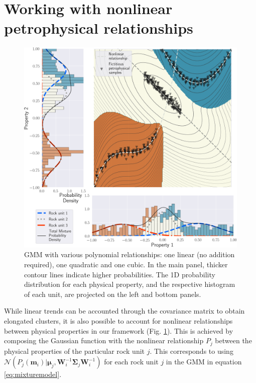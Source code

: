 \documentclass[extra, mreferee]{gji_joint} %
\begin{document}



\appendix

\section{Working with nonlinear petrophysical relationships} \label{LinearWithMappingSection}

\begin{figure}
    \includegraphics[width=\columnwidth]{Fig/LowRes/example_projection.png}
    \caption{GMM with various polynomial relationships: one linear (no addition required), one quadratic and one cubic. In the main panel, thicker contour lines indicate higher probabilities. The 1D probability distribution for each physical property, and the respective histogram of each unit, are projected on the left and bottom panels.}
    \label{fig:example_projection.png}
\end{figure}

While linear trends can be accounted through the covariance matrix to obtain elongated clusters, it is also possible to account for nonlinear relationships between physical properties in our framework (Fig. \ref{fig:example_projection.png}). This is achieved by composing the Gaussian function with the nonlinear relationship $P_j$ between the physical properties of the particular rock unit $j$. This corresponds to using $\mathcal{N}(P_j(\mathbf{m}_i)|\mathbf{\mu}_j, \mathbf{W}_i^{-1}\mathbf{\Sigma}_j\mathbf{W}_i^{-1})$ for each rock unit $j$ in the GMM in equation \eqref{eq:mixturemodel}.
\end{document}
